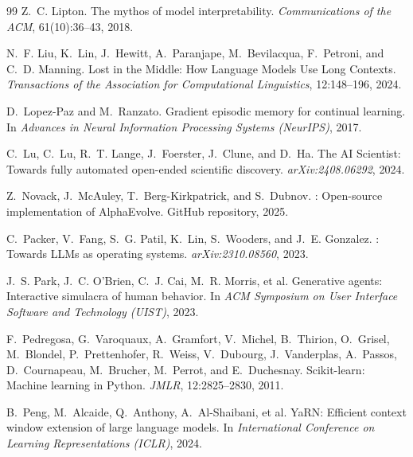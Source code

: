 \documentclass[conference]{IEEEtran}
\begin{document}
\begin{thebibliography}{99}
Z.~C. Lipton.
\newblock The mythos of model interpretability.
\newblock \emph{Communications of the ACM}, 61(10):36--43, 2018.

N.~F. Liu, K.~Lin, J.~Hewitt, A.~Paranjape, M.~Bevilacqua, F.~Petroni, and C.~D. Manning.
\newblock Lost in the Middle: How Language Models Use Long Contexts.
\newblock \emph{Transactions of the Association for Computational Linguistics}, 12:148--196, 2024.

D.~Lopez-Paz and M.~Ranzato.
\newblock Gradient episodic memory for continual learning.
\newblock In \emph{Advances in Neural Information Processing Systems (NeurIPS)}, 2017.

C.~Lu, C.~Lu, R.~T. Lange, J.~Foerster, J.~Clune, and D.~Ha.
\newblock The {AI} {Scientist}: Towards fully automated open-ended scientific discovery.
\newblock \emph{arXiv:2408.06292}, 2024.

Z.~Novack, J.~McAuley, T.~Berg-Kirkpatrick, and S.~Dubnov.
: Open-source implementation of {AlphaEvolve}.
\newblock GitHub repository, 2025.

C.~Packer, V.~Fang, S.~G. Patil, K.~Lin, S.~Wooders, and J.~E. Gonzalez.
: Towards {LLMs} as operating systems.
\newblock \emph{arXiv:2310.08560}, 2023.

J.~S. Park, J.~C. O'Brien, C.~J. Cai, M.~R. Morris, et al.
\newblock Generative agents: Interactive simulacra of human behavior.
\newblock In \emph{ACM Symposium on User Interface Software and Technology (UIST)}, 2023.

F.~Pedregosa, G.~Varoquaux, A.~Gramfort, V.~Michel, B.~Thirion, O.~Grisel, M.~Blondel, P.~Prettenhofer, R.~Weiss, V.~Dubourg, J.~Vanderplas, A.~Passos, D.~Cournapeau, M.~Brucher, M.~Perrot, and E.~Duchesnay.
\newblock Scikit-learn: Machine learning in {Python}.
\newblock \emph{JMLR}, 12:2825--2830, 2011.

B.~Peng, M.~Alcaide, Q.~Anthony, A.~Al-Shaibani, et al.
\newblock YaRN: Efficient context window extension of large language models.
\newblock In \emph{International Conference on Learning Representations (ICLR)}, 2024.


\end{thebibliography}
\end{document}
